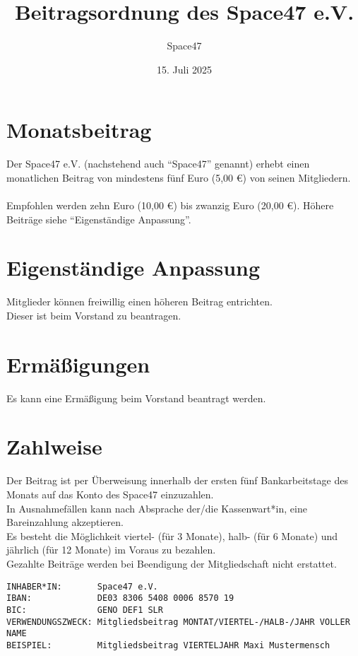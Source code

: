 \documentclass[a4paper]{article}
\title{Beitragsordnung des Space47 e.V.}
\author{Space47}
\date{15. Juli 2025}
\begin{document}
\maketitle

\section{Monatsbeitrag}
Der Space47 e.V. (nachstehend auch “Space47” genannt) erhebt einen monatlichen Beitrag von mindestens fünf Euro (5,00 €) von seinen Mitgliedern. \\ \\
Empfohlen werden zehn Euro (10,00 €) bis zwanzig Euro (20,00 €). Höhere Beiträge siehe \enquote{Eigenständige Anpassung}.

\section{Eigenständige Anpassung}
Mitglieder können freiwillig einen höheren Beitrag entrichten. \\
Dieser ist beim Vorstand zu beantragen.

\section{Ermäßigungen}
Es kann eine Ermäßigung beim Vorstand beantragt werden.

\section{Zahlweise}

Der Beitrag ist per Überweisung innerhalb der ersten fünf Bankarbeitstage des Monats auf das Konto des Space47 einzuzahlen. \\
In Ausnahmefällen kann nach Absprache der/die Kassenwart*in, eine Bareinzahlung akzeptieren. \\ 
Es besteht die Möglichkeit viertel- (für 3 Monate), halb- (für 6 Monate) und jährlich (für 12 Monate) im Voraus zu bezahlen. \\ 
Gezahlte Beiträge werden bei Beendigung der Mitgliedschaft nicht erstattet.

\begin{verbatim}
INHABER*IN:       Space47 e.V.
IBAN:             DE03 8306 5408 0006 8570 19
BIC:              GENO DEF1 SLR 
VERWENDUNGSZWECK: Mitgliedsbeitrag MONTAT/VIERTEL-/HALB-/JAHR VOLLER NAME
BEISPIEL:         Mitgliedsbeitrag VIERTELJAHR Maxi Mustermensch
\end{verbatim}
\end{document}
